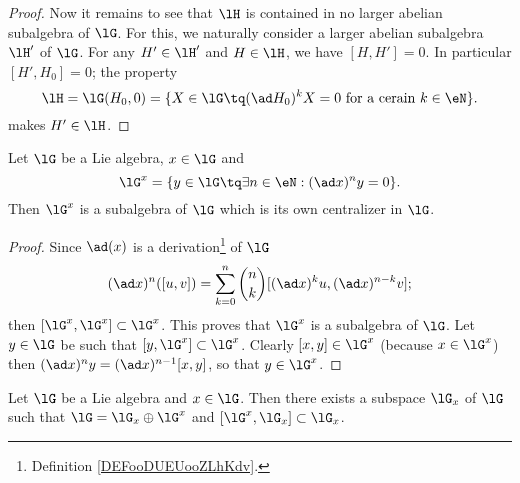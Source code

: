 \begin{proof}
	Now it remains to see that $\lH$ is contained in no larger abelian subalgebra of $\lG$. For this, we naturally consider a larger abelian subalgebra $\lH'$ of $\lG$. For any $H'\in\lH'$ and $H\in\lH$, we have $[H,H']=0$. In particular $[H',H_0]=0$; the property
	\[
		\lH=\lG(H_0,0)=\{X\in\lG\tq (\ad H_0)^kX=0\text{ for a cerain }k\in\eN\}.
	\]
	makes $H'\in\lH$.
\end{proof}


\begin{proposition}\label{prop:G_x_central}
	Let $\lG$ be a Lie algebra, $x\in\lG$ and
	\begin{equation}
		\lG^x=\{y\in\lG\tq\exists n\in\eN:(\ad x)^ny=0\}.
	\end{equation}
	Then $\lG^x$ is a subalgebra of $\lG$ which is its own centralizer in $\lG$.
\end{proposition}

\begin{proof}
	Since $\ad(x)$ is a derivation\footnote{Definition \ref{DEFooDUEUooZLhKdv}.} of $\lG$
	\[
		(\ad x)^n([u,v])=\sum_{k=0}^n \binom{n}{k} [ (\ad x)^ku,(\ad x)^{n-k}v ];
	\]
	then $[\lG^x,\lG^x]\subset\lG^x$. This proves that $\lG^x$ is a subalgebra of $\lG$. Let $y\in\lG$ be such that $[y,\lG^x]\subset\lG^x$. Clearly $[x,y]\in\lG^x$ (because $x\in\lG^x$) then $(\ad x)^ny=(\ad x)^{n-1}[x,y]$, so that $y\in\lG^x$.
\end{proof}

\begin{proposition}
	Let $\lG$ be a Lie algebra and $x\in\lG$. Then there exists a subspace $\lG_x$ of $\lG$ such that $\lG=\lG_x\oplus\lG^x$ and $[\lG^x,\lG_x]\subset\lG_x$.
	\label{prop:G_x_G_x}
\end{proposition}

